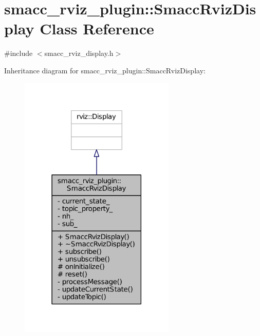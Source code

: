 \hypertarget{classsmacc__rviz__plugin_1_1SmaccRvizDisplay}{}\section{smacc\+\_\+rviz\+\_\+plugin\+:\+:Smacc\+Rviz\+Display Class Reference}
\label{classsmacc__rviz__plugin_1_1SmaccRvizDisplay}


{\ttfamily \#include $<$smacc\+\_\+rviz\+\_\+display.\+h$>$}



Inheritance diagram for smacc\+\_\+rviz\+\_\+plugin\+:\+:Smacc\+Rviz\+Display\+:
\nopagebreak
\begin{figure}[H]
\begin{center}
\leavevmode
\includegraphics[width=210pt]{classsmacc__rviz__plugin_1_1SmaccRvizDisplay__inherit__graph}
\end{center}
\end{figure}


